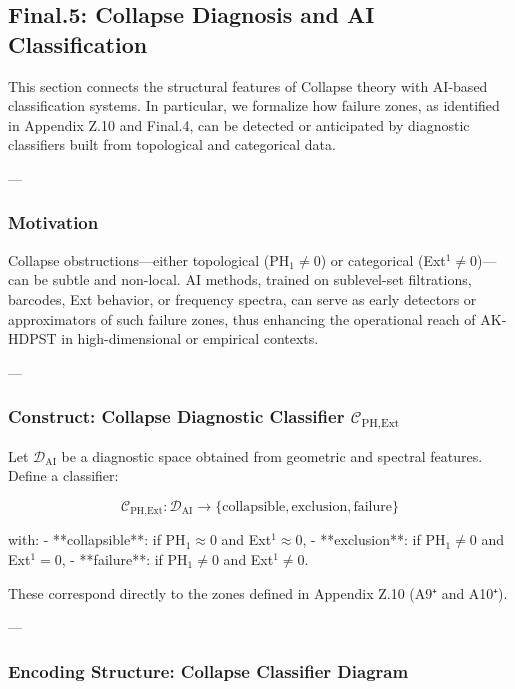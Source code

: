 \documentclass[11pt]{article}
\begin{document}
\begin{axiom}
\begin{axiom}
{{\subsection*{Final.5: Collapse Diagnosis and AI Classification}

This section connects the structural features of Collapse theory with AI-based classification systems.  
In particular, we formalize how failure zones, as identified in Appendix Z.10 and Final.4,  
can be detected or anticipated by diagnostic classifiers built from topological and categorical data.

---

\subsubsection*{Motivation}

Collapse obstructions—either topological (PH$_1 \neq 0$) or categorical (Ext$^1 \neq 0$)—can be subtle and non-local.  
AI methods, trained on sublevel-set filtrations, barcodes, Ext behavior, or frequency spectra,  
can serve as early detectors or approximators of such failure zones,  
thus enhancing the operational reach of AK-HDPST in high-dimensional or empirical contexts.

---

\subsubsection*{Construct: Collapse Diagnostic Classifier \(\mathcal{C}_{\text{PH,Ext}}\)}

Let \( \mathcal{D}_{\text{AI}} \) be a diagnostic space obtained from geometric and spectral features.  
Define a classifier:

\[
\mathcal{C}_{\text{PH,Ext}} : \mathcal{D}_{\text{AI}} \to \{ \text{collapsible}, \text{exclusion}, \text{failure} \}
\]

with:
- **collapsible**: if PH$_1 \approx 0$ and Ext$^1 \approx 0$,
- **exclusion**: if PH$_1 \neq 0$ and Ext$^1 = 0$,
- **failure**: if PH$_1 \neq 0$ and Ext$^1 \neq 0$.

These correspond directly to the zones defined in Appendix Z.10 (A9⁺ and A10⁺).

---

\subsubsection*{Encoding Structure: Collapse Classifier Diagram}

}}
\end{axiom}
\end{axiom}
\end{document}
